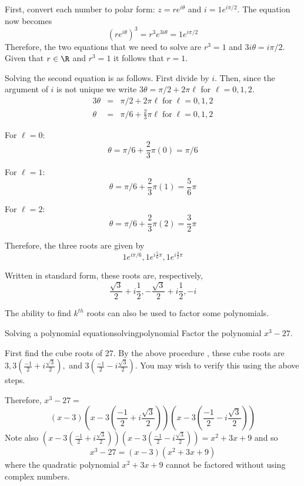 \begin{solution}
First, convert each number to polar form: $z = re^{i\theta}$ and $i = 1 e^{i \pi/2}$. The equation now becomes
\[
(re^{i\theta})^3 = r^3 e^{3i\theta} = 1 e^{i \pi/2}
\]
Therefore, the two equations that we need to solve are $r^3 = 1$ and $3i\theta = i \pi/2$. Given that $r \in \R$ and $r^3 = 1$ it follows that $r=1$. 

Solving the second equation is as follows. First divide by $i$. Then, since the argument of $i$ is not unique we write $3\theta = \pi/2 + 2\pi\ell$ for $\ell = 0,1,2$. 
\begin{eqnarray*}
3\theta &=& \pi/2 + 2\pi\ell \; \mbox{for} \; \ell = 0,1,2 \\
\theta &=& \pi/6 + \frac{2}{3} \pi\ell \; \mbox{for} \; \ell = 0,1,2 
\end{eqnarray*}

For $\ell = 0$:
\[
\theta = \pi/6 + \frac{2}{3} \pi (0) = \pi/6
\]

For $\ell = 1$:
\[
\theta = \pi/6 + \frac{2}{3} \pi(1) = \frac{5}{6} \pi
\]

For $\ell = 2$:
\[
\theta = \pi/6 + \frac{2}{3} \pi(2) = \frac{3}{2} \pi
\]

Therefore, the three roots are given by \[
1e^{i \pi/6}, 1e^{i \frac{5}{6}\pi}, 1e^{i \frac{3}{2}\pi}
\]

Written in standard form, these roots are, respectively,
\[
\frac{\sqrt{3}}{2} + i \frac{1}{2}, -\frac{\sqrt{3}}{2} + i \frac{1}{2}, -i
\]

\end{solution}

The ability to find $k^{th}$ roots can also be used to factor some
polynomials.

\begin{example}{Solving a polynomial equation}{solvingpolynomial}
Factor the polynomial $x^{3}-27.$
\end{example}

\begin{solution}
First find the cube roots of 27. By the above procedure
, these cube roots
are $3,3\left( \displaystyle
\frac{-1}{2}+i\displaystyle\frac{\sqrt{3}}{2}\right) ,$ and $3\left( 
\displaystyle\frac{-1}{2}-i\displaystyle\frac{\sqrt{3}}{2}\right) $. You may wish to verify 
this using the above steps.

Therefore, $x^{3}-27 =$
\begin{equation*}
 \left( x-3\right) \left( x-3\left( \frac{-1}{2}+i\frac{\sqrt{3}}{2}\right)
\right) \left( x-3\left( \frac{-1}{2}-i\frac{\sqrt{3}}{2}\right) \right) 
\end{equation*}
Note also $\left( x-3\left( \frac{-1}{2}+i\frac{\sqrt{3}}{2}\right) \right)
\left( x-3\left( \frac{-1}{2}-i\frac{\sqrt{3}}{2}\right) \right)
=\allowbreak x^{2}+3x+9$ and so
\begin{equation*}
x^{3}-27=\left( x-3\right) \left( x^{2}+3x+9\right)
\end{equation*}
where the quadratic polynomial $x^{2}+3x+9$ cannot be factored without using
complex numbers.
\end{solution}

